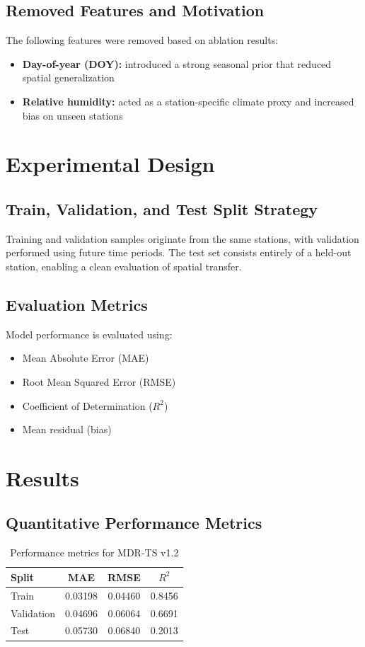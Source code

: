 \documentclass[11pt]{article}
\begin{document}
\subsection{Removed Features and Motivation}
The following features were removed based on ablation results:
\begin{itemize}
\item \textbf{Day-of-year (DOY):} introduced a strong seasonal prior that reduced spatial generalization
\item \textbf{Relative humidity:} acted as a station-specific climate proxy and increased bias on unseen stations
\end{itemize}

\section{Experimental Design}

\subsection{Train, Validation, and Test Split Strategy}
Training and validation samples originate from the same stations, with validation performed using future time periods. The test set consists entirely of a held-out station, enabling a clean evaluation of spatial transfer.

\subsection{Evaluation Metrics}
Model performance is evaluated using:
\begin{itemize}
\item Mean Absolute Error (MAE)
\item Root Mean Squared Error (RMSE)
\item Coefficient of Determination ($R^2$)
\item Mean residual (bias)
\end{itemize}

\section{Results}

\subsection{Quantitative Performance Metrics}

\begin{table}[H]
\centering
\begin{tabular}{lccc}
\toprule
Split & MAE & RMSE & $R^2$ \\
\midrule
Train & 0.03198 & 0.04460 & 0.8456 \\
Validation & 0.04696 & 0.06064 & 0.6691 \\
Test & 0.05730 & 0.06840 & 0.2013 \\
\bottomrule
\end{tabular}
\caption{Performance metrics for MDR-TS v1.2}
\end{table}
\end{document}

